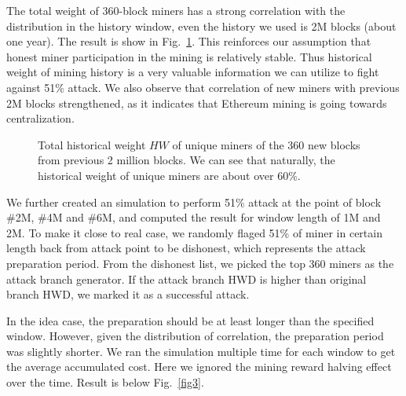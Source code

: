 \documentclass[conference]{IEEEtran}
\begin{document}
The total weight of 360-block miners has a strong correlation with the distribution in the history window, even the history we used is 2M blocks (about one year). The result is show in Fig.~\ref{fig2}. This reinforces our assumption that honest miner participation in the mining is relatively stable. Thus historical weight of mining history is a very valuable information we can utilize to fight against 51\% attack. We also observe that correlation of new miners with previous 2M blocks strengthened, as it indicates that Ethereum mining is going towards centralization. 

\begin{figure}[htbp]
    \caption{Total historical weight $H\!W$ of unique miners of the 360 new blocks from previous 2 million blocks. We can see that naturally, the historical weight of unique miners are about over 60\%.}
    \label{fig2}
    \end{figure}    
    
We further created an simulation to perform 51\% attack at the point of block \#2M, \#4M and \#6M, and computed the result for window length of 1M and 2M. To make it close to real case, we randomly flaged 51\% of miner in certain length back from attack point to be dishonest, which represents the attack preparation period. From the dishonest list, we picked the top 360 miners as the attack branch generator. If the attack branch HWD is higher than original branch HWD, we marked it as a successful attack. 

In the idea case, the preparation should be at least longer than the specified window. However, given the distribution of correlation, the preparation period was slightly shorter. We ran the simulation multiple time for each window to get the average accumulated cost. Here we ignored the mining reward halving effect over the time. Result is below Fig.~\ref{fig3}.
\end{document}
